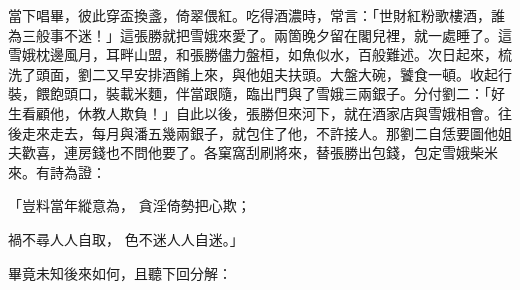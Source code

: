 當下唱畢，彼此穿盃換盞，倚翠偎紅。吃得酒濃時，常言：「世財紅粉歌樓酒，誰為三般事不迷！」這張勝就把雪娥來愛了。兩箇晚夕留在閣兒裡，就一處睡了。這雪娥枕邊風月，耳畔山盟，和張勝儘力盤桓，如魚似水，百般難述。次日起來，梳洗了頭面，劉二又早安排酒餚上來，與他姐夫扶頭。大盤大碗，饕食一頓。收起行裝，餵飽頭口，裝載米麵，伴當跟隨，臨出門與了雪娥三兩銀子。分付劉二：「好生看顧他，休教人欺負！」自此以後，張勝但來河下，就在酒家店與雪娥相會。往後走來走去，每月與潘五幾兩銀子，就包住了他，不許接人。那劉二自恁要圖他姐夫歡喜，連房錢也不問他要了。各窠窩刮刷將來，替張勝出包錢，包定雪娥柴米來。有詩為證：

「豈料當年縱意為，  貪淫倚勢把心欺；

禍不尋人人自取，  色不迷人人自迷。」

畢竟未知後來如何，且聽下回分解：

